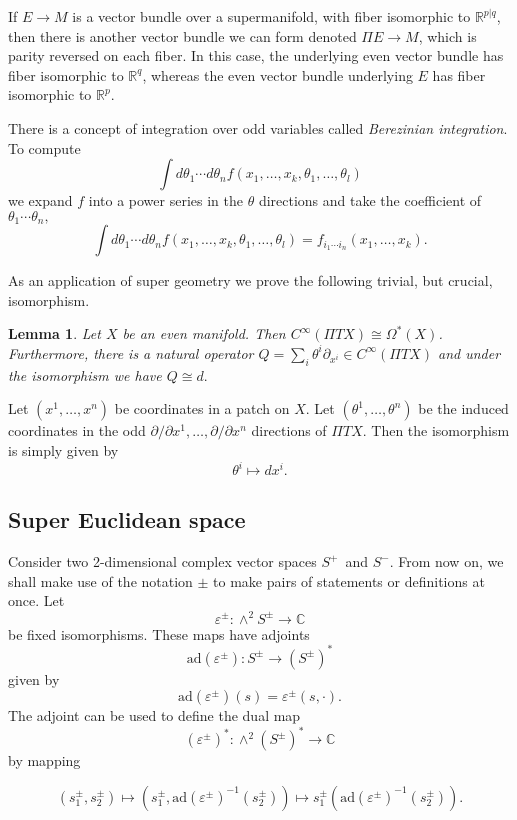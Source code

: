 \documentclass[twoside]{amsart}
\newcommand{\CC}{\ensuremath{\mathbb{C}}}
\newcommand{\RR}{\ensuremath{\mathbb{R}}}
\newtheorem{lemma}{Lemma}
\renewcommand{\epsilon}{\varepsilon}
\newcommand{\enm}[1]{\ensuremath{#1}}
\newcommand{\superijk}[3]{\enm{{#1}^{#2|#3}}}
\newcommand{\rrpq}{\superijk{\RR}{p}{q}}
\newcommand{\ad}{\enm{\mathrm{ad}}}
\newcommand{\formsij}[2]{\ensuremath{\Omega^{#1}({#2})}}
\newcommand{\spl}{\enm{S^{+}}}
\newcommand{\sm}{\enm{S^{-}}}
\newcommand{\spm}{\enm{S^{\pm}}}
\newcommand{\eps}{\enm{\epsilon}}
\renewcommand{\epsilon}{\varepsilon}
\begin{document}
If \( E\to M \) is a vector bundle over a supermanifold, with fiber
isomorphic to \rrpq, then there is another vector bundle we can form
denoted \( \Pi E\to M \), which is parity reversed on each fiber.  In
this case, the underlying even vector bundle has fiber isomorphic to
\( \RR^q \), whereas the even vector bundle underlying \( E \) has
fiber isomorphic to \( \RR^p \).

There is a concept of integration over odd variables called
\emph{Berezinian integration}.  To compute
\[ \int d\theta_{1}\cdots d\theta_{n} f(x_{1}, \ldots, x_{k},
\theta_{1}, \ldots, \theta_{l}) \]
we expand \( f \) into a power series in the \( \theta \) directions
and take the coefficient of \( \theta_{1}\cdots\theta_{n}, \)
\[ \int d\theta_{1}\cdots d\theta_{n} f(x_{1}, \ldots, x_{k},
\theta_{1}, \ldots, \theta_{l}) = f_{i_{1}\cdots i_{n}}(x_{1},\ldots,
x_{k}). \]

As an application of super geometry we prove the following trivial,
but crucial, isomorphism.
\begin{lemma}
   \label{lemma:functionsforms}
   Let \( X \) be an even manifold. Then \( C^{\infty}(\Pi
TX)\cong    \formsij{*}{X} \).  Furthermore, there is a natural
operator \( Q=\sum_{i}\theta^{i}\partial_{x^{i}}\in C^{\infty}(\Pi TX)
\) and under the isomorphism we have \( Q\cong d. \)
\end{lemma}
\proof Let \( (x^1,\ldots,x^n) \) be coordinates in a patch on \( X
\).  Let \( (\theta^1, \ldots, \theta^n) \) be the induced
coordinates in the odd \( \partial/\partial x^1, \ldots,
\partial/\partial x^n \) directions of \( \Pi TX \).  Then the isomorphism is simply
given by
\[ \theta^i\mapsto dx^i. \]
\subsection{Super Euclidean space}
Consider two 2-dimensional complex vector spaces \spl\ and \sm.  From now on, we shall make use of the notation \( \pm \) to make pairs of statements or definitions at once.  Let
\[ \eps^{\pm}:\wedge^{2}\spm\to \CC \] be fixed isomorphisms.  These
maps have adjoints
\[ \ad(\eps^{\pm}): \spm\to (\spm)^{*} \]
given by
\[ \ad(\eps^{\pm})(s) = \eps^{\pm}(s, \cdot). \]
The adjoint can be used to define the dual map
\[ (\eps^{\pm})^{*}:\wedge^{2}(\spm)^{*}\to\CC \]
by mapping

\[ (s_{1}^{\pm}, s_{2}^{\pm})\mapsto
(s_{1}^{\pm}, \ad(\eps^{\pm})^{-1}(s_{2}^{\pm})) \mapsto
s_{1}^{\pm} (\ad(\epsilon^{\pm})^{-1}(s_{2}^{\pm})).
\]
\end{document}
